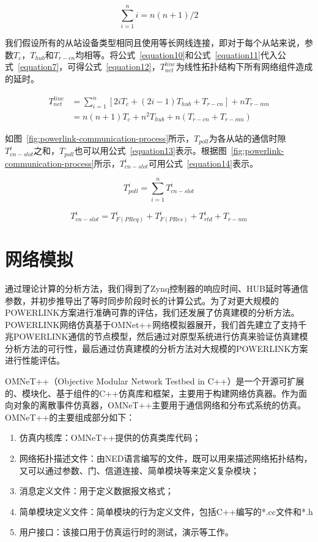 \begin{equation}
\label{equation11}
\sum_{i=1}^ni=n(n+1)/2
\end{equation}

我们假设所有的从站设备类型相同且使用等长网线连接，即对于每个从站来说，参数$T_{c}$，$T_{hub}$和$T_{r-cn}$均相等。将公式~\ref{equation10}和公式~\ref{equation11}代入公式~\ref{equation7}，可得公式~\ref{equation12}，$T_{net}^{line}$为线性拓扑结构下所有网络组件造成的延时。

\begin{equation}
\begin{split}
\label{equation12}
T_{net}^{line}&=\sum_{i=1}^n[2iT_{c}+(2i-1)T_{hub}+T_{r-cn}]+nT_{r-mn}\\
&=n(n+1)T_{c}+n^2T_{hub}+n(T_{r-cn}+T_{r-mn})
\end{split}
\end{equation}

如图~\ref{fig:powerlink-communication-process}所示，$T_{poll}$为各从站的通信时隙$T_{cn-slot}^{i}$之和，$T_{poll}$也可以用公式~\ref{equation13}表示。根据图~\ref{fig:powerlink-communication-process}所示，$T_{cn-slot}^{i}$可用公式~\ref{equation14}表示。

\begin{equation}
\label{equation13}
T_{poll}^{i}=\sum_{i=1}^nT_{cn-slot}^{i}
\end{equation}

\begin{equation}
\label{equation14}
T_{cn-slot}^{i}=T_{F(PReq)}^{i}+T_{F(PRes)}^{i}+T_{rtd}^{i}+T_{r-mn}
\end{equation}

\section{网络模拟}
通过理论计算的分析方法，我们得到了Zynq控制器的响应时间、HUB延时等通信参数，并初步推导出了等时同步阶段时长的计算公式。为了对更大规模的POWERLINK方案进行准确可靠的评估，我们还发展了仿真建模的分析方法。POWERLINK网络仿真基于OMNet++网络模拟器展开，我们首先建立了支持千兆POWERLINK通信的节点模型，然后通过对原型系统进行仿真来验证仿真建模分析方法的可行性，最后通过仿真建模的分析方法对大规模的POWERLINK方案进行性能评估。

OMNeT++（Objective Modular Network Testbed in C++）是一个开源可扩展的、模块化、基于组件的C++仿真库和框架，主要用于构建网络仿真器。作为面向对象的离散事件仿真器，OMNeT++主要用于通信网络和分布式系统的仿真。OMNeT++的主要组成部分如下：

\begin{enumerate}
  \item 仿真内核库：OMNeT++提供的仿真类库代码；
  \item 网络拓扑描述文件：由NED语言编写的文件，既可以用来描述网络拓扑结构，又可以通过参数、门、信道连接、简单模块等来定义复杂模块；
  \item 消息定义文件：用于定义数据报文格式；
  \item 简单模块定义文件：简单模块的行为定义文件，包括C++编写的*.cc文件和*.h
  \item 用户接口：该接口用于仿真运行时的测试，演示等工作。
\end{enumerate}

